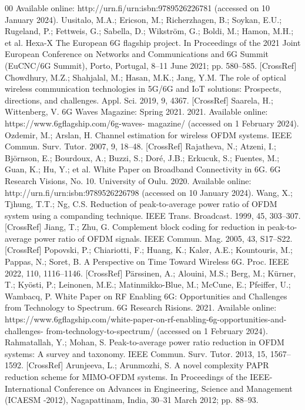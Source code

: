 \documentclass[conference]{IEEEtran}
\begin{document}
\begin{thebibliography}{00}
 Available online: http://urn.fi/urn:isbn:9789526226781 (accessed on 10 January 2024).
 Uusitalo, M.A.; Ericson, M.; Richerzhagen, B.; Soykan, E.U.; Rugeland, P.; Fettweis, G.; Sabella, D.; Wikström, G.; Boldi, M.; Hamon, M.H.; et al. Hexa-X The European 6G flagship project. In Proceedings of the 2021 Joint European Conference on Networks and Communications and 6G Summit (EuCNC/6G Summit), Porto, Portugal, 8–11 June 2021; pp. 580–585. [CrossRef]
 Chowdhury, M.Z.; Shahjalal, M.; Hasan, M.K.; Jang, Y.M. The role of optical wireless communication technologies in 5G/6G and IoT solutions: Prospects, directions, and challenges. Appl. Sci. 2019, 9, 4367. [CrossRef]
 Saarela, H.; Wittenberg, V. 6G Waves Magazine: Spring 2021. 2021. Available online: https://www.6gflagship.com/6g-waves- magazine/ (accessed on 1 February 2024).
 Ozdemir, M.; Arslan, H. Channel estimation for wireless OFDM systems. IEEE Commun. Surv. Tutor. 2007, 9, 18–48. [CrossRef]
 Rajatheva, N.; Atzeni, I.; Björnson, E.; Bourdoux, A.; Buzzi, S.; Doré, J.B.; Erkucuk, S.; Fuentes, M.; Guan, K.; Hu, Y.; et al. White Paper on Broadband Connectivity in 6G. 6G Research Visions, No. 10. University of Oulu. 2020. Available online: http://urn.fi/urn:isbn:9789526226798 (accessed on 10 January 2024).
 Wang, X.; Tjhung, T.T.; Ng, C.S. Reduction of peak-to-average power ratio of OFDM system using a companding technique. IEEE Trans. Broadcast. 1999, 45, 303–307. [CrossRef]
 Jiang, T.; Zhu, G. Complement block coding for reduction in peak-to-average power ratio of OFDM signals. IEEE Commun. Mag. 2005, 43, S17–S22. [CrossRef]
 Popovski, P.; Chiariotti, F.; Huang, K.; Kalør, A.E.; Kountouris, M.; Pappas, N.; Soret, B. A Perspective on Time Toward Wireless 6G. Proc. IEEE 2022, 110, 1116–1146. [CrossRef]
 Pärssinen, A.; Alouini, M.S.; Berg, M.; Kürner, T.; Kyösti, P.; Leinonen, M.E.; Matinmikko-Blue, M.; McCune, E.; Pfeiffer, U.; Wambacq, P. White Paper on RF Enabling 6G: Opportunities and Challenges from Technology to Spectrum. 6G Research Risions. 2021. Available online: https://www.6gflagship.com/white-paper-on-rf-enabling-6g-opportunities-and-challenges- from-technology-to-spectrum/ (accessed on 1 February 2024).
 Rahmatallah, Y.; Mohan, S. Peak-to-average power ratio reduction in OFDM systems: A survey and taxonomy. IEEE Commun. Surv. Tutor. 2013, 15, 1567–1592. [CrossRef]
 Arunjeeva, L.; Arunmozhi, S. A novel complexity PAPR reduction scheme for MIMO-OFDM systems. In Proceedings of the IEEE-International Conference on Advances in Engineering, Science and Management (ICAESM -2012), Nagapattinam, India, 30–31 March 2012; pp. 88–93.

\end{thebibliography}
\end{document}

